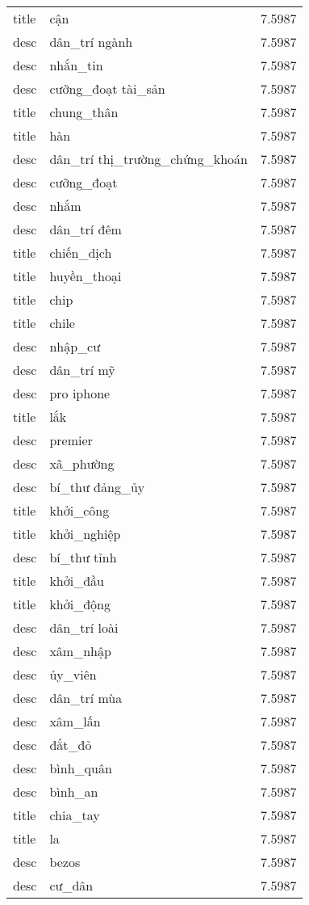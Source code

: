 \documentclass{article}
\begin{document}
\begin{tabular}{lll}
title & cận & 7.5987\\
desc & dân\_trí ngành & 7.5987\\
desc & nhắn\_tin & 7.5987\\
desc & cưỡng\_đoạt tài\_sản & 7.5987\\
title & chung\_thân & 7.5987\\
title & hàn & 7.5987\\
desc & dân\_trí thị\_trường\_chứng\_khoán & 7.5987\\
desc & cưỡng\_đoạt & 7.5987\\
desc & nhắm & 7.5987\\
desc & dân\_trí đêm & 7.5987\\
title & chiến\_dịch & 7.5987\\
title & huyền\_thoại & 7.5987\\
title & chip & 7.5987\\
title & chile & 7.5987\\
desc & nhập\_cư & 7.5987\\
desc & dân\_trí mỹ & 7.5987\\
desc & pro iphone & 7.5987\\
title & lắk & 7.5987\\
desc & premier & 7.5987\\
desc & xã\_phường & 7.5987\\
desc & bí\_thư đảng\_ủy & 7.5987\\
title & khởi\_công & 7.5987\\
title & khởi\_nghiệp & 7.5987\\
desc & bí\_thư tỉnh & 7.5987\\
title & khởi\_đầu & 7.5987\\
title & khởi\_động & 7.5987\\
desc & dân\_trí loài & 7.5987\\
desc & xâm\_nhập & 7.5987\\
desc & ủy\_viên & 7.5987\\
desc & dân\_trí mùa & 7.5987\\
desc & xâm\_lấn & 7.5987\\
desc & đắt\_đỏ & 7.5987\\
desc & bình\_quân & 7.5987\\
desc & bình\_an & 7.5987\\
title & chia\_tay & 7.5987\\
title & la & 7.5987\\
desc & bezos & 7.5987\\
desc & cư\_dân & 7.5987\\

\end{tabular}
\end{document}
